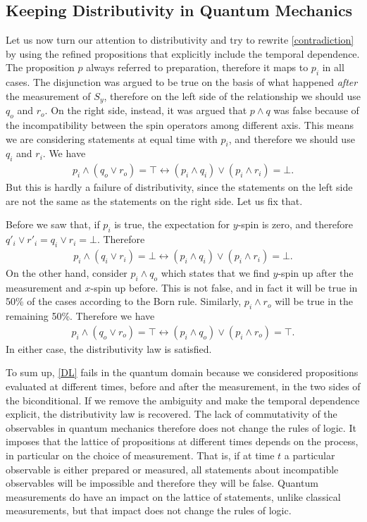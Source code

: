\documentclass[11pt, executivepaper]{article}
\begin{document}
\subsection{Keeping Distributivity in Quantum Mechanics}

Let us now turn our attention to distributivity and try to rewrite \eqref{contradiction} by using the refined propositions that explicitly include the temporal dependence. The proposition $p$ always referred to preparation, therefore it maps to $p_i$ in all cases. The disjunction was argued to be true on the basis of what happened \emph{after} the measurement of $S_y$, therefore on the left side of the relationship we should use $q_o$ and $r_o$. On the right side, instead, it was argued that $p \wedge q$ was false because of the incompatibility between the spin operators among different axis. This means we are considering statements at equal time with $p_i$, and therefore we should use $q_i$ and $r_i$. We have 
\begin{align}
	\label{solved_contradiction}
	p_i \wedge (q_o \vee r_o) = \top \longleftrightarrow (p_i \wedge q_i) \vee (p_i\wedge r_i) = \bot.
\end{align}
\noindent But this is hardly a failure of distributivity, since the statements on the left side are not the same as the statements on the right side. Let us fix that.

Before we saw that, if $p_i$ is true, the expectation for $y$-spin is zero, and therefore $q'_i \vee r'_i = q_i \vee r_i = \bot$. Therefore
\begin{align}
	\label{solved_distrib_1}
	p_i \wedge (q_i \vee r_i) = \bot \longleftrightarrow (p_i \wedge q_i) \vee (p_i\wedge r_i) = \bot.
\end{align}
\noindent On the other hand, consider $p_i \wedge q_o$ which states that we find $y$-spin up after the measurement and $x$-spin up before. This is not false, and in fact it will be true in 50\% of the cases according to the Born rule. Similarly, $p_i \wedge r_o$ will be true in the remaining 50\%. Therefore we have
\begin{align}
	\label{solved_distrib_2}
	p_i \wedge (q_o \vee r_o) = \top \longleftrightarrow (p_i \wedge q_o) \vee (p_i\wedge r_o) = \top.
\end{align}
\noindent In either case, the distributivity law is satisfied.

To sum up, \eqref{DL} fails in the quantum domain because we considered propositions evaluated at different times, before and after the measurement, in the two sides of the biconditional. If we remove the ambiguity and make the temporal dependence explicit, the distributivity law is recovered. The lack of commutativity of the observables in quantum mechanics therefore does not change the rules of logic. It imposes that the lattice of propositions at different times depends on the process, in particular on the choice of measurement. That is, if at time $t$ a particular observable is either prepared or measured, all statements about incompatible observables will be impossible and therefore they will be false. Quantum measurements do have an impact on the lattice of statements, unlike classical measurements, but that impact does not change the rules of logic.
\end{document}
